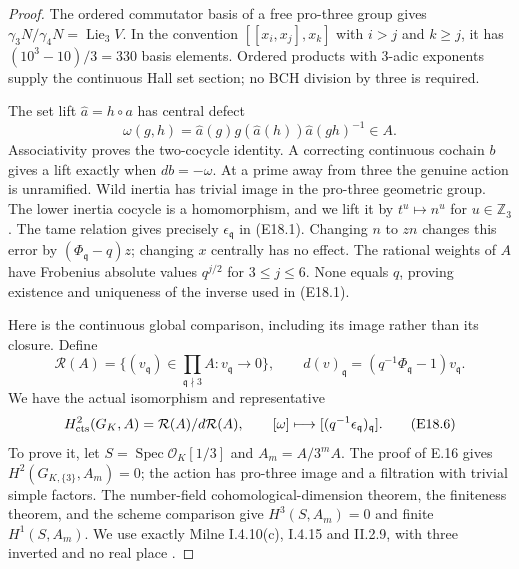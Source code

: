 \begin{proof}
The ordered commutator basis of a free pro-three
group gives $\gamma_3N/\gamma_4N=\operatorname{Lie}_3V$.
In the convention $[[x_i,x_j],x_k]$ with $i>j$ and
$k\ge j$, it has $(10^3-10)/3=330$ basis elements.
Ordered products with $3$-adic exponents supply the
continuous Hall set section; no BCH division by
three is required.

The set lift $\widehat a=h\circ a$ has central defect
\[
 \omega(g,h)=\widehat a(g)g(\widehat a(h))
                    \widehat a(gh)^{-1}\in A.
 \tag{E18.5}
\]
Associativity proves the two-cocycle identity.
A correcting continuous cochain $b$ gives a lift
exactly when $db=-\omega$. At a prime away from
three the genuine action is unramified. Wild
inertia has trivial image in the pro-three
geometric group. The lower inertia cocycle is a
homomorphism, and we lift it by
$t^u\mapsto n^u$ for $u\in\mathbb Z_3$.
The tame relation gives precisely
$\epsilon_{\mathfrak q}$ in (E18.1).
Changing $n$ to $zn$ changes this error by
$(\Phi_{\mathfrak q}-q)z$; changing $x$ centrally
has no effect. The rational weights of $A$ have
Frobenius absolute values $q^{j/2}$ for
$3\le j\le6$. None equals $q$, proving existence
and uniqueness of the inverse used in (E18.1).

Here is the continuous global comparison, including
its image rather than its closure. Define
\[
 \mathcal R(A)=\{(v_{\mathfrak q})\in
          \prod_{\mathfrak q\nmid3}A:
                   v_{\mathfrak q}\longrightarrow0\},
 \qquad d(v)_{\mathfrak q}=(q^{-1}\Phi_{\mathfrak q}-1)v_{\mathfrak q}.
\]
We have the actual isomorphism and representative
\[
 H^2_{\rm cts}(G_K,A)=\mathcal R(A)/d\mathcal R(A),
 \qquad [\omega]\longmapsto
       [(q^{-1}\epsilon_{\mathfrak q})_{\mathfrak q}].
 \tag{E18.6}
\]
To prove it, let $S=\operatorname{Spec}\mathcal O_K[1/3]$
and $A_m=A/3^mA$. The proof of E.16 gives
$H^2(G_{K,\{3\}},A_m)=0$; the action has pro-three
image and a filtration with trivial simple factors.
The number-field cohomological-dimension theorem,
the finiteness theorem, and the scheme comparison
give $H^3(S,A_m)=0$ and finite $H^1(S,A_m)$.
We use exactly Milne I.4.10(c), I.4.15 and II.2.9,
with three inverted and no real place
\cite{E_density_MilneADT}.


\end{proof}
